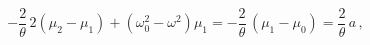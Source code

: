 \begin{equation}
-\frac2\theta\,2(\mu_2-\mu_1)+(\omega_0^2-\omega^2)\mu_1=
-\frac2\theta\,(\mu_1-\mu_0) = \frac2\theta \,a \,,
\end{equation}


